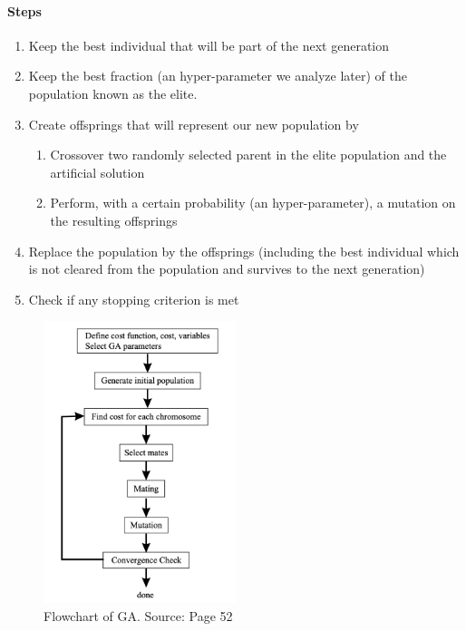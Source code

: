     \paragraph{Steps}

        \begin{enumerate}
            \item Keep the best individual that will be part of the next generation  
            \item Keep the best fraction (an hyper-parameter we analyze later) of the population known as the elite.
            \item Create offsprings that will represent our new population by
            \begin{enumerate}
                \item Crossover two randomly selected parent in the elite population and the artificial solution
                \item Perform, with a certain probability (an hyper-parameter), a mutation on the resulting offsprings
            \end{enumerate}
            \item Replace the population by the offsprings (including the best individual which is not cleared from the population and survives to the next generation)
            \item Check if any stopping criterion is met
        \end{enumerate}

        \begin{figure}[H]
            \centering
            \includegraphics[width=0.5\textwidth]{img/contiGA.png}
            \caption{Flowchart of GA. Source: \cite{contiGA} Page 52}
        \end{figure}
    

